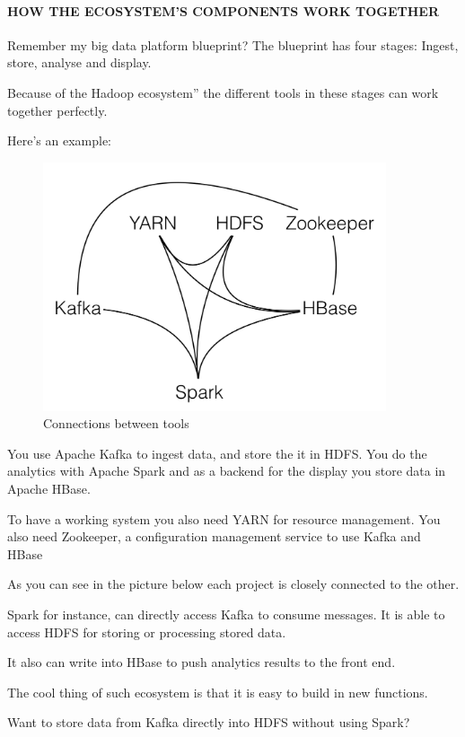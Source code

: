\documentclass[12pt]{scrartcl} %
\begin{document}
\paragraph{HOW THE ECOSYSTEM’S COMPONENTS WORK TOGETHER}
Remember my big data platform blueprint? The blueprint has four stages: Ingest, store, analyse and display.

Because of the Hadoop ecosystem” the different tools in these stages can work together perfectly.

Here’s an example:
\begin{figure}[htbp] 
  \centering
     \includegraphics[width=0.9\textwidth]{images/Hadoop-Ecosystem-Connections.png}
  \caption{Connections between tools}
  \label{fig:Bild1}
\end{figure}

You use Apache Kafka to ingest data, and store the it in HDFS. You do the analytics with Apache Spark and as a backend for the display you store data in Apache HBase.

To have a working system you also need YARN for resource management. You also need Zookeeper, a configuration management service to use Kafka and HBase

As you can see in the picture below each project is closely connected to the other.

Spark for instance, can directly access Kafka to consume messages. It is able to access HDFS for storing or processing stored data.

It also can write into HBase to push analytics results to the front end.


The cool thing of such ecosystem is that it is easy to build in new functions.

Want to store data from Kafka directly into HDFS without using Spark?
\end{document}
